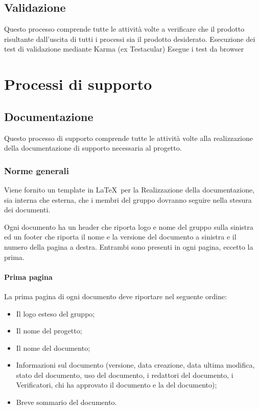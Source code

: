 \subsection{Validazione}
Questo processo comprende tutte le attività volte a verificare che il prodotto risultante dall'uscita di tutti i processi sia il prodotto desiderato.
Esecuzione dei test di validazione mediante Karma (ex Testacular)
Esegue i test da browser 

\section{Processi di supporto}


\subsection{Documentazione}
Questo processo di supporto comprende tutte le attività volte alla realizzazione della documentazione di supporto necessaria al progetto.


\subsubsection{Norme generali}


Viene fornito un template in \LaTeX\ per la Realizzazione della documentazione, sia interna che esterna, che i membri del gruppo dovranno seguire nella stesura dei documenti.

Ogni documento ha un header che riporta logo e nome del gruppo sulla sinistra ed un footer che riporta il nome e la versione del documento a sinistra e il numero della pagina a destra. Entrambi sono presenti in ogni pagina, eccetto la prima.

\paragraph{Prima pagina}
\label{5.2.3}
La prima pagina di ogni documento deve riportare nel seguente ordine:
\begin{itemize}
\item Il logo esteso del gruppo;
\item Il nome del progetto;
\item Il nome del documento;
\item Informazioni sul documento (versione, data creazione, data ultima modifica, stato del documento, uso del documento, i redattori del documento, i Verificatori, chi ha approvato il documento e la  del documento);
\item Breve sommario del documento.
\end{itemize}

